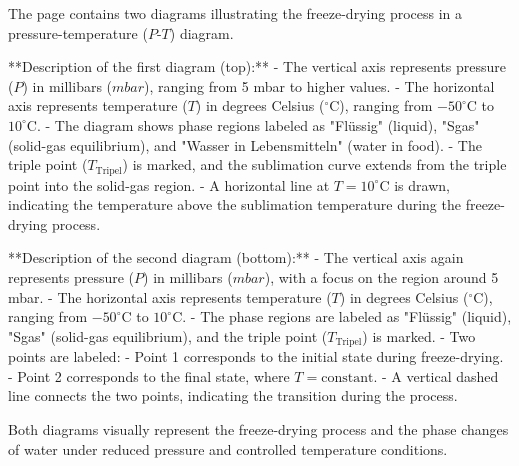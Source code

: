 The page contains two diagrams illustrating the freeze-drying process in a pressure-temperature (\(P\)-\(T\)) diagram.  

**Description of the first diagram (top):**  
- The vertical axis represents pressure (\(P\)) in millibars (\(mbar\)), ranging from 5 mbar to higher values.  
- The horizontal axis represents temperature (\(T\)) in degrees Celsius (\(^\circ\text{C}\)), ranging from \(-50^\circ\text{C}\) to \(10^\circ\text{C}\).  
- The diagram shows phase regions labeled as "Flüssig" (liquid), "Sgas" (solid-gas equilibrium), and "Wasser in Lebensmitteln" (water in food).  
- The triple point (\(T_{\text{Tripel}}\)) is marked, and the sublimation curve extends from the triple point into the solid-gas region.  
- A horizontal line at \(T = 10^\circ\text{C}\) is drawn, indicating the temperature above the sublimation temperature during the freeze-drying process.  

**Description of the second diagram (bottom):**  
- The vertical axis again represents pressure (\(P\)) in millibars (\(mbar\)), with a focus on the region around 5 mbar.  
- The horizontal axis represents temperature (\(T\)) in degrees Celsius (\(^\circ\text{C}\)), ranging from \(-50^\circ\text{C}\) to \(10^\circ\text{C}\).  
- The phase regions are labeled as "Flüssig" (liquid), "Sgas" (solid-gas equilibrium), and the triple point (\(T_{\text{Tripel}}\)) is marked.  
- Two points are labeled:  
  - Point 1 corresponds to the initial state during freeze-drying.  
  - Point 2 corresponds to the final state, where \(T = \text{constant}\).  
- A vertical dashed line connects the two points, indicating the transition during the process.  

Both diagrams visually represent the freeze-drying process and the phase changes of water under reduced pressure and controlled temperature conditions.